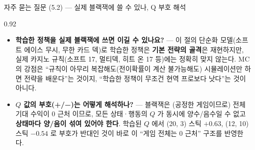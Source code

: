 \begin{frame}{자주 묻는 질문 (5.2) --- 실제 블랙잭에 쓸 수
있나, Q 부호 해석}
\begin{center}\begin{varwidth}{0.92\textwidth}
  \begin{itemize}
    \item \textbf{학습한 정책을 실제 블랙잭에 쓰면 이길 수
      있나요?} --- 이 절의 단순화 모델(소프트 에이스 무시,
      무한 카드 덱)로 학습한 정책은 \textbf{기본 전략의
      골격}은 재현하지만, 실제 카지노 규칙(소프트 17,
      멀티덱, 히트 온 17 등)에는 정확히 맞지 않는다. MC 의
      강점은 ``규칙이 아무리 복잡해도(전이확률이 계산
      불가능해도) 시뮬레이션만 하면 전략을 배운다''는 것이지,
      ``학습한 정책이 무조건 현역 프로보다 낫다''는 것이
      아니다.
    \item \textbf{$Q$ 값의 부호(+/−)는 어떻게 해석하나?} ---
      블랙잭은 (공정한 게임이므로) 전체 기대 수익이 0 근처
      이므로, 모든 상태·행동의 $Q$ 가 동시에 양수/음수일 수
      없고 \textbf{상태마다 양/음이 섞여 있어야 한다}. 학습된
      $Q$ 에서 (20, 3) 스틱 $+0.63$, (12, 10) 스틱 $-0.54$ 로
      부호가 반대인 것이 바로 이 ``게임 전체는 0 근처''
      구조를 반영한다.
  \end{itemize}
\end{varwidth}\end{center}
\end{frame}
